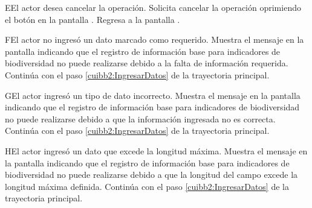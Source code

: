     \begin{UCtrayectoriaA}{E}{El actor desea cancelar la operación.}
    \UCpaso[\UCactor] Solicita cancelar la operación oprimiendo el botón  en la pantalla .
    \UCpaso[] Regresa a la pantalla . 
    \end{UCtrayectoriaA}
  
    \begin{UCtrayectoriaA}{F}{El actor no ingresó un dato marcado como requerido.}    
    \UCpaso[\UCsist] Muestra el mensaje  en la pantalla  indicando que el registro de información base para indicadores de biodiversidad no puede realizarse debido a la falta de información requerida.
    \UCpaso[] Continúa con el paso \ref{cuibb2:IngresarDatos} de la trayectoria principal.     
    \end{UCtrayectoriaA}
 
        \begin{UCtrayectoriaA}{G}{El actor ingresó un tipo de dato incorrecto.}    
    \UCpaso[\UCsist] Muestra el mensaje  en la pantalla  indicando que el registro de información base para indicadores de biodiversidad no puede realizarse debido a que la información ingresada no es correcta.
    \UCpaso[] Continúa con el paso \ref{cuibb2:IngresarDatos} de la trayectoria principal.     
    \end{UCtrayectoriaA}
    
            \begin{UCtrayectoriaA}{H}{El actor ingresó un dato que excede la longitud máxima.}    
    \UCpaso[\UCsist] Muestra el mensaje  en la pantalla  indicando que el registro de información base para indicadores de biodiversidad no puede realizarse debido a que la longitud del campo excede la longitud máxima definida.
    \UCpaso[] Continúa con el paso \ref{cuibb2:IngresarDatos} de la trayectoria principal.     
    \end{UCtrayectoriaA}